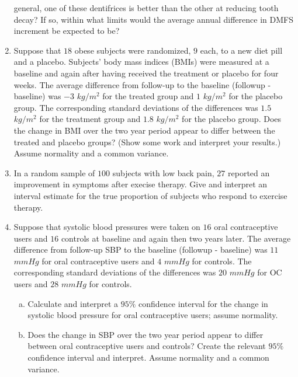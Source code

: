 \documentclass[12pt]{article}
\begin{document}
\begin{enumerate}[Problem 1.]
  general, one of these dentifrices is better than the other at
  reducing tooth decay?  If so, within what limits would the average
  annual difference in DMFS increment be expected to be?
\item Suppose that $18$ obese subjects were randomized, $9$ each, to a
  new diet pill and a placebo. Subjects' body mass indices (BMIs) were
  measured at a baseline and again after having received the treatment
  or placebo for four weeks.  The average difference from follow-up to
  the baseline (followup - baseline) was $-3$ $kg/m^2$ for the treated
  group and $1$ $kg/m^2$ for the placebo group.  The corresponding
  standard deviations of the differences was $1.5$ $kg / m^2$ for the
  treatment group and $1.8$ $kg / m^2$ for the placebo group. Does the
  change in BMI over the two year period appear to differ between the
  treated and placebo groups? (Show some work and interpret your
  results.) Assume normality and a
  common variance.
\item In a random sample of $100$ subjects with low back pain, $27$
  reported an improvement in symptoms after execise therapy. Give and
  interpret an interval estimate for the
  true proportion of subjects who respond to exercise therapy.
  \item Suppose that systolic blood pressures were taken on $16$
oral contraceptive users and $16$ controls at baseline and again then
two years later. The average difference from follow-up SBP to the
baseline (followup - baseline) was $11$ $mmHg$ for oral contraceptive
users and $4$ $mmHg$ for controls.  The corresponding standard
deviations of the differences was $20$ $mmHg$ for OC users and $28$
$mmHg$ for controls.
\begin{enumerate}[a.]
\item Calculate and interpret a $95\%$ confidence interval for the
  change in systolic blood pressure for oral contraceptive users;
  assume
  normality.
\item Does the change in SBP over the two year period appear to differ
  between oral contraceptive users and controls? Create the relevant
  $95\%$ confidence interval and interpret.  Assume normality and a
  common variance.
\end{enumerate}

\end{enumerate}
\end{document}
